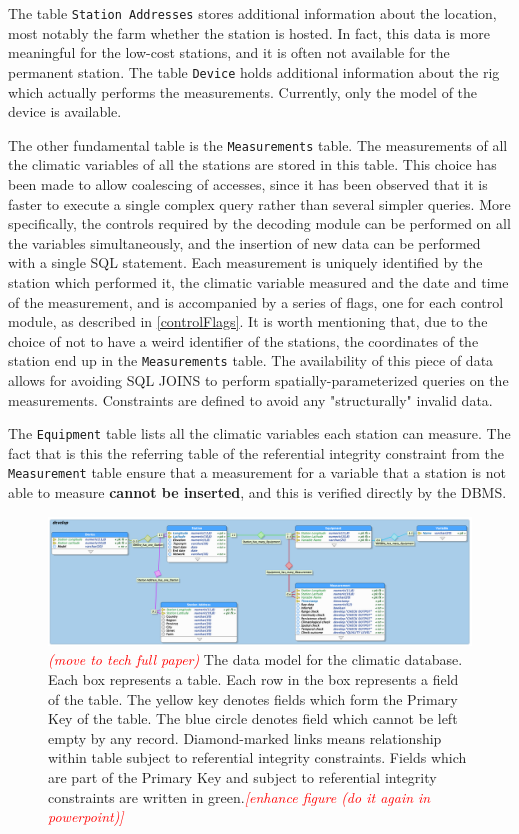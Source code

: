 \documentclass[authoryear,preprint,review,12pt]{elsarticle}
\newcommand{\note}[1]{\emph{\textcolor{red}{#1}}}
\begin{document}
The table \texttt{Station Addresses} stores additional information about the location, most notably the farm whether the station is hosted. In fact, this data is more meaningful for the low-cost stations, and it is often not available for the permanent station. The table \texttt{Device} holds additional information about the rig which actually performs the measurements. Currently, only the model of the device is available.

The other fundamental table is the \texttt{Measurements} table. The measurements of all the climatic variables of all the stations are stored in this table. This choice has been made to allow coalescing of accesses, since it has been observed that it is faster to execute a single complex query rather than several simpler queries. More specifically, the controls required by the decoding module can be performed on all the variables simultaneously, and the insertion of new data can be performed with a single SQL statement. Each measurement is uniquely identified by the station which performed it, the climatic variable measured and the date and time of the measurement, and is accompanied by a series of flags, one for each control module, as described in \cref{controlFlags}. It is worth mentioning that, due to the choice of not to have a weird identifier of the stations, the coordinates of the station end up in the \texttt{Measurements} table. The availability of this piece of data allows for avoiding SQL JOINS to perform spatially-parameterized queries on the measurements. Constraints are defined to avoid any "structurally" invalid data.

The \texttt{Equipment} table lists all the climatic variables each station can measure. The fact that is this the referring table of the referential integrity constraint from the \texttt{Measurement} table ensure that a measurement for a variable that a station is not able to measure \textbf{cannot be inserted}, and this is verified directly by the DBMS.

\begin{figure}
	\includegraphics[scale=.26]{ERD}
	\caption{ \note{(move to tech full paper)} The data model for the climatic database. Each box represents a table. Each row in the box represents a field of the table. The yellow key denotes fields which form the Primary Key of the table. The blue circle denotes field which cannot be left empty by any record. Diamond-marked links means relationship within table subject to referential integrity constraints. Fields which are part of the Primary Key and subject to referential integrity constraints are written in green.\note{[enhance figure (do it again in powerpoint)]}}
	\label{ERD}
\end{figure}
\end{document}
